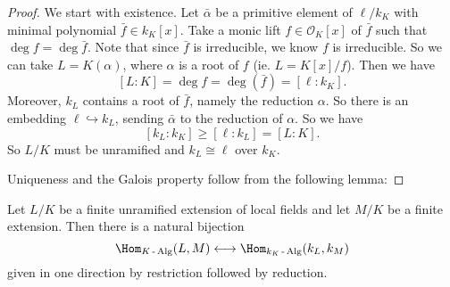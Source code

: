 \documentclass[a4paper]{article}
\begin{document}
\begin{proof}
  We start with existence. Let $\bar{\alpha}$ be a primitive element of $\ell/k_K$ with minimal polynomial $\bar{f} \in k_K[x]$. Take a monic lift $f \in \mathcal{O}_K[x]$ of $\bar{f}$ such that $\deg f = \deg \bar{f}$. Note that since $\bar{f}$ is irreducible, we know $f$ is irreducible. So we can take $L = K(\alpha)$, where $\alpha$ is a root of $f$ (ie. $L = K[x]/f$). Then we have
  \[
    [L:K] = \deg f = \deg(\bar{f}) = [\ell:k_K].
  \]
  Moreover, $k_L$ contains a root of $\bar{f}$, namely the reduction $\alpha$. So there is an embedding $\ell \hookrightarrow k_L$, sending $\bar{\alpha}$ to the reduction of $\alpha$. So we have
  \[
    [k_L:k_K] \geq [\ell:k_L] = [L:K].
  \]
  So $L/K$ must be unramified and $k_L \cong \ell$ over $k_K$.

  Uniqueness and the Galois property follow from the following lemma:
\end{proof}

\begin{lemma}
  Let $L/K$ be a finite unramified extension of local fields and let $M/K$ be a finite extension. Then there is a natural bijection
  \[
    \Hom_{K\operatorname{-}\mathrm{Alg}}(L, M) \longleftrightarrow \Hom_{k_K\operatorname{-}\mathrm{Alg}} (k_L, k_M)
  \]
  given in one direction by restriction followed by reduction.
\end{lemma}
\end{document}
